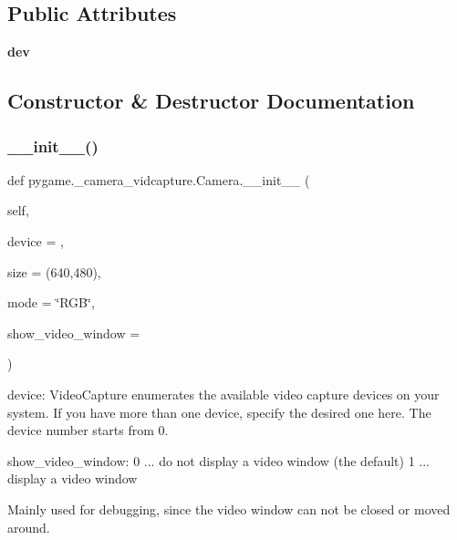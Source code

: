 \subsection*{Public Attributes}
\begin{DoxyCompactItemize}
\item 
\mbox{\label{classpygame_1_1__camera__vidcapture_1_1_camera_ad1e0f69ea1a8387766661430f0d1d311}} 
{\bfseries dev}
\end{DoxyCompactItemize}


\subsection{Constructor \& Destructor Documentation}
\mbox{\label{classpygame_1_1__camera__vidcapture_1_1_camera_ad12b0b95400eb62c70bb4dfe4fd31462}} 
\subsubsection{\texorpdfstring{\+\_\+\+\_\+init\+\_\+\+\_\+()}{\_\_init\_\_()}}
{\footnotesize\ttfamily def pygame.\+\_\+camera\+\_\+vidcapture.\+Camera.\+\_\+\+\_\+init\+\_\+\+\_\+ (\begin{DoxyParamCaption}\item[{}]{self,  }\item[{}]{device = {},  }\item[{}]{size = {\ttfamily (640,480)},  }\item[{}]{mode = {\ttfamily \char`\"{}RGB\char`\"{}},  }\item[{}]{show\+\_\+video\+\_\+window = {} }\end{DoxyParamCaption})}

\begin{DoxyVerb}device:  VideoCapture enumerates the available video capture devices
    on your system.  If you have more than one device, specify
    the desired one here.  The device number starts from 0.

   show_video_window: 0 ... do not display a video window (the default)
              1 ... display a video window

            Mainly used for debugging, since the video window
            can not be closed or moved around.
\end{DoxyVerb}
 

